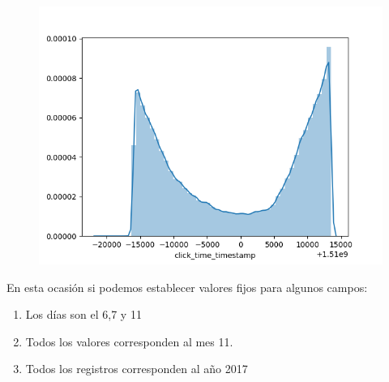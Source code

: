 \begin{figure}
\includegraphics[scale=0.5]{img/normalDistclick_time_timestamp.png}
\end{figure}
En esta ocasión si podemos establecer valores fijos para algunos campos:
\begin{enumerate}
	\item Los días son el 6,7 y 11
	\item Todos los valores corresponden al mes 11.
	\item Todos los registros corresponden al año 2017
\end{enumerate}

